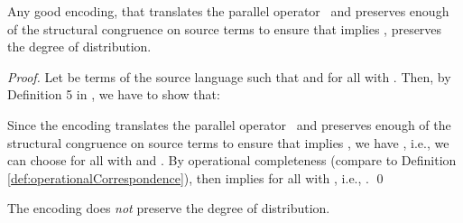 \documentclass[]{llncs}
\begin{document}
\begin{lemma}
	Any good encoding, that translates the parallel operator \cleanly\ and preserves enough of the structural congruence on source terms to ensure that  implies , preserves the degree of distribution.
\end{lemma}

\begin{proof}
	Let  be terms of the source language such that  and  for all  with . Then, by Definition 5 in \cite{petersNestmann12}, we have to show that:
	
	Since the encoding translates the parallel operator \cleanly\ and preserves enough of the structural congruence on source terms to ensure that  implies , we have , i.e., we can choose  for all  with  and . By operational completeness (compare to Definition \ref{def:operationalCorrespondence}), then  implies  for all  with , i.e., .
	\qed
\end{proof}

\begin{lemma}
\label{lem:EncodingMixAsynNotPreservesDegreeOfDistribution}
	The encoding  does \emph{not} preserve the degree of distribution.
\end{lemma}
\end{document}
